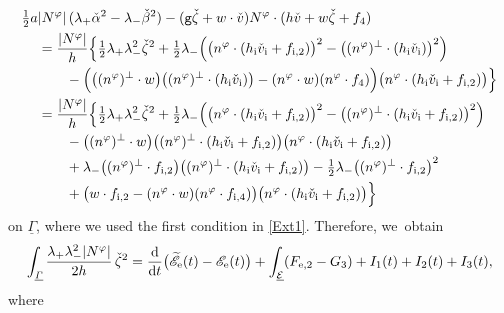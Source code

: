 \documentclass[JEP,XML,SOM,Unicode,NoFloatCountersInSection,published]{cedram}
\newcommand{\gr}{{\mathtt g}}
\newcommand{\cE}{{\mathcal E}}
\newcommand{\ul}[1]{\underline{#1}}
\newcommand{\itGamma}{\mathit{\Gamma}}
\theoremstyle{definition}
\begin{document}
\begin{align*}
\tfrac12a&|N^\varphi|\,(\lambda_+\check{\alpha}^2-\lambda_-\check{\beta}^2)
- (\gr\check{\zeta}+w\cdot\check{v})N^\varphi\cdot(h\check{v}+w\check{\zeta}+f_4) \\
&= \frac{|N^\varphi|}{h}\Bigl\{ \tfrac12\lambda_+\lambda_-^2\check{\zeta}^2
+ \tfrac12\lambda_-\Bigl(\bigl(n^\varphi\cdot(h_\mathrm{i}\check{v}_\mathrm{i}+f_{{\rm i},2}) \bigr)^2 - \bigl((n^\varphi)^\perp\cdot(h_\mathrm{i}\check{v}_\mathrm{i}) \bigr)^2 \Bigr) \\
&\qquad
- \Bigl(\bigl((n^\varphi)^\perp\cdot w \bigr) \bigl((n^\varphi)^\perp\cdot(h_\mathrm{i}\check{v}_\mathrm{i}) \bigr)
- (n^\varphi\cdot w)(n^\varphi\cdot f_4) \Bigr) \bigl(n^\varphi\cdot(h_\mathrm{i}\check{v}_\mathrm{i}+f_{{\rm i},2}) \bigr) \Bigr\} \\
&= \frac{|N^\varphi|}{h}\Bigl\{ \tfrac12\lambda_+\lambda_-^2\check{\zeta}^2
+ \tfrac12\lambda_-\Bigl(\bigl(n^\varphi\cdot(h_\mathrm{i}\check{v}_\mathrm{i}+f_{{\rm i},2}) \bigr)^2
- \bigl((n^\varphi)^\perp\cdot(h_\mathrm{i}\check{v}_\mathrm{i}+f_{{\rm i},2}) \bigr)^2 \Bigr) \\
&\qquad
- \bigl((n^\varphi)^\perp\cdot w \bigr) \bigl((n^\varphi)^\perp\cdot(h_\mathrm{i}\check{v}_\mathrm{i}+f_{{\rm i},2}) \bigr) \bigl(n^\varphi\cdot(h_\mathrm{i}\check{v}_\mathrm{i}+f_{{\rm i},2}) \bigr) \\
&\qquad
+ \lambda_- \bigl((n^\varphi)^\perp\cdot f_{{\rm i},2} \bigr) \bigl((n^\varphi)^\perp\cdot(h_\mathrm{i}\check{v}_\mathrm{i}+f_{{\rm i},2}) \bigr)
- \tfrac12\lambda_- \bigl((n^\varphi)^\perp\cdot f_{{\rm i},2} \bigr)^2 \\
&\qquad
+ \bigl(w\cdot f_{{\rm i},2} - (n^\varphi\cdot w)(n^\varphi\cdot f_{{\rm i},4}) \bigr) \bigl(n^\varphi\cdot(h_\mathrm{i}\check{v}_\mathrm{i}+f_{{\rm i},2}) \bigr) \Bigr\}
\end{align*}
on $\ul{\itGamma}$, where we used the first condition in \eqref{Ext1}.
Therefore, we~obtain
\begin{equation}\label{EqCF6}
\int_{\ul{\itGamma}}\frac{\lambda_+\lambda_-^2|N^\varphi|}{2h}\,\check{\zeta}^2
= \frac{\rm d}{{\rm d}t} \bigl(\widetilde{\mathscr{E}}_\mathrm{e}(t)-\mathscr{E}_\mathrm{e}(t) \bigr) + \int_{\ul{\cE}}(F_{{\rm e},2}-G_3) + I_1(t) + I_2(t) + I_3(t),
\end{equation}
where
\end{document}
